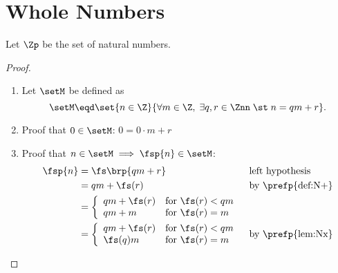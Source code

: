 \section{Whole Numbers}
\begin{definition}
\label{def:W}
\indxs{\Znn}
Let $\Zp$ be the set of natural numbers.
\end{definition}

\begin{theorem}[Division]
\label{thm:N_div}
\end{theorem}
\begin{proof}
\begin{enumerate}
  \item Let $\setM$ be defined as
    \[ \setM \eqd \set{n\in\Z}{\forall m\in\Z,\; \exists q,r\in\Znn \;\st\; n=qm+r}. \]

  \item Proof that $0\in\setM$:  $0 = 0\cdot m + r$

  \item Proof that $n\in\setM\implies\fsp{n}\in\setM$:
    \begin{align*}
      \fsp{n}
        &= \fs\brp{qm+r}
        && \text{left hypothesis}
      \\&= qm + \fs(r)
        && \text{by \prefp{def:N+}}
      \\&= \left\{\begin{array}{ll}
             qm + \fs(r)     & \text{for $\fs(r)<q m$}\\
             qm + m          & \text{for $\fs(r)=m$}
           \end{array}\right.
      \\&= \left\{\begin{array}{ll}
             qm + \fs(r)     & \text{for $\fs(r)<q m$}\\
             \fs(q) m        & \text{for $\fs(r)=m$}
           \end{array}\right.
        && \text{by \prefp{lem:Nx}}
    \end{align*}
\end{enumerate}
\end{proof}



